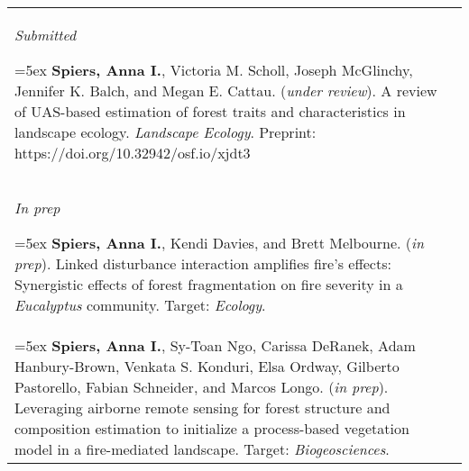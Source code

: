 \begin{longtable}{@{} >{\raggedright}p{6.10in} >{\raggedleft}X @{}}

\emph{Submitted}

\hangindent=5ex \textbf{Spiers, Anna I.}, Victoria M. Scholl, Joseph McGlinchy, Jennifer K. Balch, and Megan E. Cattau. (\emph{under review}). A review of UAS-based estimation of forest traits and characteristics in landscape ecology. \emph{Landscape Ecology}. Preprint: https://doi.org/10.32942/osf.io/xjdt3 & \tabularnewline

\emph{In prep}

\hangindent=5ex \textbf{Spiers, Anna I.}, Kendi Davies, and Brett Melbourne. (\emph{in prep}). Linked disturbance interaction amplifies fire's effects: Synergistic effects of forest fragmentation on fire severity in a \emph{Eucalyptus} community. Target: \emph{Ecology}. & \tabularnewline

\hangindent=5ex \textbf{Spiers, Anna I.}, Sy-Toan Ngo, Carissa DeRanek, Adam Hanbury-Brown, Venkata S. Konduri, Elsa Ordway, Gilberto Pastorello, Fabian Schneider, and Marcos Longo. (\emph{in prep}). Leveraging airborne remote sensing for forest structure and composition estimation to initialize a process-based vegetation model in a fire-mediated landscape. Target: \emph{Biogeosciences}. & \tabularnewline

\end{longtable}

